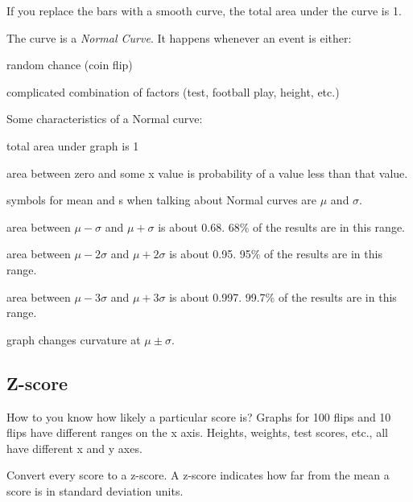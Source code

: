 \documentclass{exam}
\begin{document}
  If you replace the bars with a smooth curve, the total area under the curve is 1.

  The curve is a {\em Normal Curve}.  It happens whenever an event is either:
  \begin{itemize*}
    \item random chance (coin flip)
    \item complicated combination of factors (test, football play, height, etc.)
  \end{itemize*}

  Some characteristics of a Normal curve:
  \begin{itemize*}
    \item total area under graph is 1

    \item area between zero and some x value is probability of a value less than that
      value.

    \item symbols for mean and s when talking about Normal curves are $\mu$ and
      $\sigma$.

    \item area between $\mu - \sigma$ and $\mu + \sigma$ is about 0.68.  68\% of the
      results are in this range.

    \item area between $\mu - 2 \sigma$ and $\mu + 2 \sigma$ is about 0.95.  95\% of
      the results are in this range.

    \item area between $\mu - 3 \sigma$ and $\mu + 3 \sigma$ is about 0.997.  99.7\%
      of the results are in this range.

    \item graph changes curvature at $\mu \pm \sigma$.

  \end{itemize*}

  \subsection{Z-score}

  How to you know how likely a particular score is?  Graphs for 100 flips and 10 flips
  have different ranges on the x axis.  Heights, weights, test scores, etc., all have
  different x and y axes.

  Convert every score to a z-score.  A z-score indicates how far from the mean a score is
  in standard deviation units.
\end{document}
